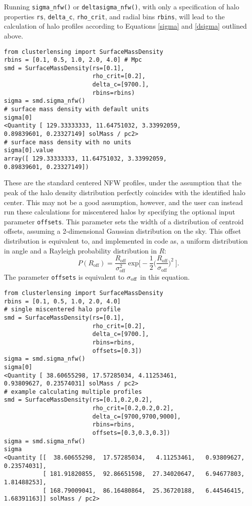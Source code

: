 \documentclass[twocolumn]{aastex6}
\newcommand{\code}{\lstinline[style=codeintext]}
\begin{document}
Running \code{sigma_nfw()} or \code{deltasigma_nfw()}, with only a specification of halo properties \code{rs}, \code{delta_c}, \code{rho_crit}, and radial bins \code{rbins}, will lead to the calculation of halo profiles according to Equations \ref{sigma} and \ref{dsigma} outlined above. 

\begin{lstlisting}
from clusterlensing import SurfaceMassDensity
rbins = [0.1, 0.5, 1.0, 2.0, 4.0] # Mpc
smd = SurfaceMassDensity(rs=[0.1], 
                         rho_crit=[0.2], 
                         delta_c=[9700.], 
                         rbins=rbins)
sigma = smd.sigma_nfw()
# surface mass density with default units
sigma[0]
<Quantity [ 129.33333333, 11.64751032, 3.33992059, 
0.89839601, 0.23327149] solMass / pc2>
# surface mass density with no units
sigma[0].value
array([ 129.33333333, 11.64751032, 3.33992059, 
0.89839601, 0.23327149])
\end{lstlisting}

These are the standard centered NFW profiles, under the assumption that the peak of the halo density distribution perfectly coincides with the identified halo center. This may not be a good assumption, however, and the user can instead run these calculations for miscentered halos by specifying the optional input parameter \code{offsets}. This parameter sets the width of a distribution of centroid offsets, assuming a 2-dimensional Gaussian distribution on the sky. This offset distribution is equivalent to, and implemented in code as, a uniform distribution in angle and a Rayleigh probability distribution in $R$:
\begin{equation}\label{PofR}
P(R_{\mathrm{off}})=\frac{R_{\mathrm{off}}}{\sigma_{\mathrm{off}}^2}\ \mathrm{exp}\bigg[-\frac{1}{2}\bigg(\frac{R_{\mathrm{off}}}{\sigma_{\mathrm{off}}}\bigg)^2\ \bigg].
\end{equation}
The parameter \code{offsets} is equivalent to $\sigma_{\rm off}$ in this equation.

\begin{lstlisting}
from clusterlensing import SurfaceMassDensity
rbins = [0.1, 0.5, 1.0, 2.0, 4.0]
# single miscentered halo profile
smd = SurfaceMassDensity(rs=[0.1], 
                         rho_crit=[0.2], 
                         delta_c=[9700.], 
                         rbins=rbins,
                         offsets=[0.3])
sigma = smd.sigma_nfw()
sigma[0]
<Quantity [ 38.60655298, 17.57285034, 4.11253461, 
0.93809627, 0.23574031] solMass / pc2>
# example calculating multiple profiles
smd = SurfaceMassDensity(rs=[0.1,0.2,0.2], 
                         rho_crit=[0.2,0.2,0.2], 
                         delta_c=[9700,9700,9000], 
                         rbins=rbins, 
                         offsets=[0.3,0.3,0.3])
sigma = smd.sigma_nfw()
sigma 
<Quantity [[  38.60655298,  17.57285034,   4.11253461,   0.93809627,   0.23574031],
           [ 181.91820855,  92.86651598,  27.34020647,   6.94677803,  1.81488253],
           [ 168.79009041,  86.16480864,  25.36720188,   6.44546415,  1.68391163]] solMass / pc2>
\end{lstlisting}
\end{document}
